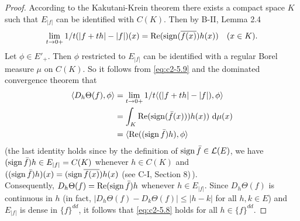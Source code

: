 \begin{proof}
According to the Kakutani-Krein theorem there exists a compact space
$K$ such that $E_{|f|}$ can be identified with $C(K)$. Then by B-II,
Lemma 2.4
\begin{equation}\label{eq:c2-5.9}
\lim_{t \to 0+} 1/t(|f+th| - |f|)(x) = \mathop{}\!\mathrm{Re}(\operatorname{sign} (\overline{f(x)})h(x)) \quad (x \in K).
\end{equation}
Let $\phi \in E'_{+}$. Then $\phi$ restricted to $E_{|f|}$ can be identified with a regular Borel measure $\mu$ on $C(K)$.
So it follows from \eqref{eq:c2-5.9} and the dominated convergence theorem that
\begin{align*}
\langle D_{h}\Theta(f),\phi \rangle &= \lim_{t \to 0+} 1/t \langle(|f + th| - |f|),\phi \rangle\\
&= \int_{K} \mathop{}\!\mathrm{Re}(\operatorname{sign} (\bar{f}(x)))h(x)) \, \mathop{}\!\mathrm{d}{\mu(x)} \\
&= \langle\mathop{}\!\mathrm{Re}((\operatorname{sign}  \bar{f})h),\phi\rangle
\end{align*}
(the last identity holds since by the definition of $\operatorname{sign}  \bar{f} \in \mathcal{L}(E)$,
we have $(\operatorname{sign}  \bar{f})h \in E_{|f|} = C(K)$ whenever $h \in C(K)$ and
$
((\operatorname{sign}  \bar{f})h)(x) = (\operatorname{sign}  \overline{f(x)})h(x)
$  
(see C-I, Section 8)\,).\\
Consequently, $D_{h}\Theta(f) = \mathop{}\!\mathrm{Re}(\operatorname{sign}  \bar{f})h$ whenever $h \in E_{|f|}$. 
Since $D_{h}\Theta(f)$ is continuous in $h$ (in fact, $|D_{h}\Theta(f) - D_{k}\Theta(f)| \leq |h - k|$ for all $h,k \in E$) and $E_{|f|}$ is dense in $\{f\}^{dd}$, it follows that \eqref{eq:c2-5.8} holds for all $h \in \{f\}^{dd}$.
\end{proof}

